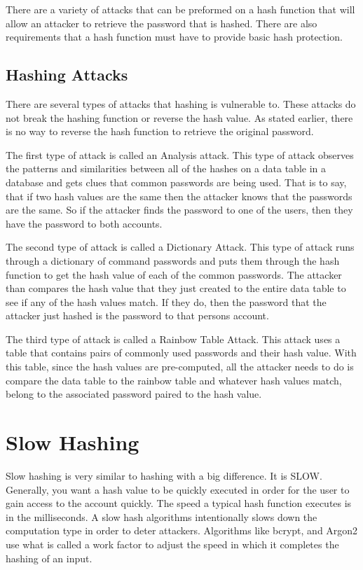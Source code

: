 \documentclass[12pt]{article}
\begin{document}
There are a variety of attacks that can be preformed on a hash function that will allow an attacker to retrieve the password that is hashed. There are also requirements that a hash function must have to provide basic hash protection.

\subsection{Hashing Attacks}
There are several types of attacks that hashing is vulnerable to. These attacks do not break the hashing function or reverse the hash value. As stated earlier, there is no way to reverse the hash function to retrieve the original password. 

The first type of attack is called an Analysis attack. This type of attack observes the patterns and similarities between all of the hashes on a data table in a database and gets clues that common passwords are being used. That is to say, that if two hash values are the same then the attacker knows that the passwords are the same. So if the attacker finds the password to one of the users, then they have the password to both accounts. 

The second type of attack is called a Dictionary Attack. This type of attack runs through a dictionary of command passwords and puts them through the hash function to get the hash value of each of the common passwords. The attacker than compares the hash value that they just created to the entire data table to see if any of the hash values match. If they do, then the password that the attacker just hashed is the password to that persons account. 

The third type of attack is called a Rainbow Table Attack. This attack uses a table that contains pairs of commonly used passwords and their hash value. With this table, since the hash values are pre-computed, all the attacker needs to do is compare the data table to the rainbow table and whatever hash values match, belong to the associated password paired to the hash value. 
\endadjustwidth

\section{Slow Hashing}
Slow hashing is very similar to hashing with a big difference. It is SLOW. Generally, you want a hash value to be quickly executed in order for the user to gain access to the account quickly. The speed a typical hash function executes is in the milliseconds. 
A slow hash algorithms intentionally slows down the computation type in order to deter attackers. Algorithms like bcrypt, and Argon2 use what is called a work factor to adjust the speed in which it completes the hashing of an input. 
\end{document}
